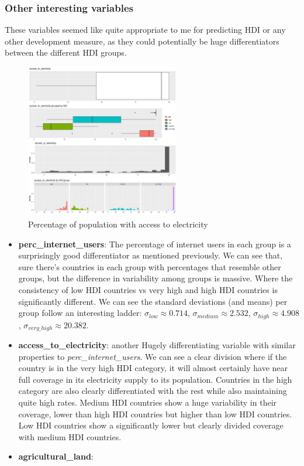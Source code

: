 \documentclass[]{article}
\providecommand{\tightlist}{%
  \setlength{\itemsep}{0pt}\setlength{\parskip}{0pt}}
\begin{document}
\hypertarget{other-interesting-variables}{%
\subsubsection{Other interesting
variables}\label{other-interesting-variables}}

These variables seemed like quite appropriate to me for predicting HDI
or any other development measure, as they could potentially be huge
differentiators between the different HDI groups.

\begin{figure}
\centering
\includegraphics[width=0.6\textwidth,height=\textheight]{./img/access_to_electricity.png}
\caption{Percentage of population with access to electricity}
\end{figure}

\begin{itemize}
\tightlist
\item
  \textbf{perc\_internet\_users}: The percentage of internet users in
  each group is a surprisingly good differentiator as mentioned
  previously. We can see that, sure there's countries in each group with
  percentages that resemble other groups, but the difference in
  variability among groups is massive. Where the consistency of low HDI
  countries vs very high and high HDI countries is significantly
  different. We can see the standard deviations (and means) per group
  follow an interesting ladder: \(\sigma_{low} \approx 0.714\),
  \(\sigma_{medium} \approx 2.532\), \(\sigma_{high} \approx 4.908\),
  \(\sigma_{very\_high} \approx 20.382\).
\item
  \textbf{access\_to\_electricity}: another Hugely differentiating
  variable with similar properties to \emph{perc\_internet\_users}. We
  can see a clear division where if the country is in the very high HDI
  category, it will almost certainly have near full coverage in its
  electricity supply to its population. Countries in the high category
  are also clearly differentiated with the rest while also maintaining
  quite high rates. Medium HDI countries show a huge variability in
  their coverage, lower than high HDI countries but higher than low HDI
  countries. Low HDI countries show a significantly lower but clearly
  divided coverage with medium HDI countries.
\item
  \textbf{agricultural\_land}:
\end{itemize}
\end{document}
